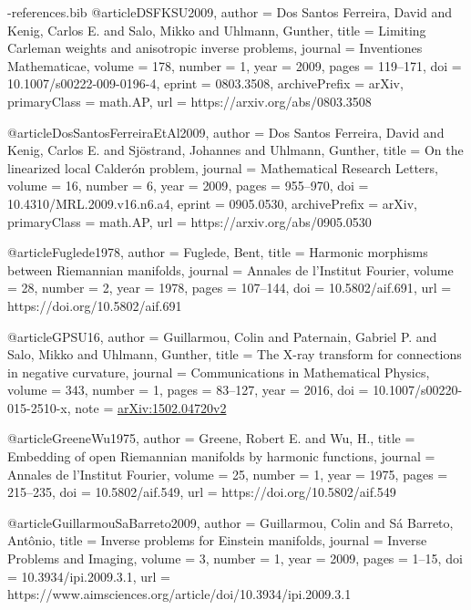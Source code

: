 \documentclass[11pt,a4paper]{article}
\theoremstyle{definition}
\theoremstyle{remark}
\numberwithin{equation}{section}
\begin{document}
\begin{filecontents*}[overwrite]{\jobname-references.bib}
@article{DSFKSU2009,
  author = {{Dos Santos Ferreira}, David and Kenig, Carlos E. and Salo, Mikko and Uhlmann, Gunther},
  title = {Limiting {Carleman} weights and anisotropic inverse problems},
  journal = {Inventiones Mathematicae},
  volume = {178},
  number = {1},
  year = {2009},
  pages = {119--171},
  doi = {10.1007/s00222-009-0196-4},
  eprint = {0803.3508},
  archivePrefix = {arXiv},
  primaryClass = {math.AP},
  url = {https://arxiv.org/abs/0803.3508}
}

@article{DosSantosFerreiraEtAl2009,
  author = {{Dos Santos Ferreira}, David and Kenig, Carlos E. and Sj{\"o}strand, Johannes and Uhlmann, Gunther},
  title = {On the linearized local {Calder{\'o}n} problem},
  journal = {Mathematical Research Letters},
  volume = {16},
  number = {6},
  year = {2009},
  pages = {955--970},
  doi = {10.4310/MRL.2009.v16.n6.a4},
  eprint = {0905.0530},
  archivePrefix = {arXiv},
  primaryClass = {math.AP},
  url = {https://arxiv.org/abs/0905.0530}
}

@article{Fuglede1978,
  author  = {Fuglede, Bent},
  title   = {Harmonic morphisms between {Riemannian} manifolds},
  journal = {Annales de l'Institut Fourier},
  volume  = {28},
  number  = {2},
  year    = {1978},
  pages   = {107--144},
  doi     = {10.5802/aif.691},
  url     = {https://doi.org/10.5802/aif.691}
}

@article{GPSU16,
  author = {Guillarmou, Colin and Paternain, Gabriel P. and Salo, Mikko and Uhlmann, Gunther},
  title = {The {X}-ray transform for connections in negative curvature},
  journal = {Communications in Mathematical Physics},
  volume = {343}, number = {1}, pages = {83--127}, year = {2016},
  doi = {10.1007/s00220-015-2510-x},
  note = {\href{https://arxiv.org/abs/1502.04720v2}{arXiv:1502.04720v2}}
}

@article{GreeneWu1975,
  author  = {Greene, Robert E. and Wu, H.},
  title   = {Embedding of open {Riemannian} manifolds by harmonic functions},
  journal = {Annales de l'Institut Fourier},
  volume  = {25},
  number  = {1},
  year    = {1975},
  pages   = {215--235},
  doi     = {10.5802/aif.549},
  url     = {https://doi.org/10.5802/aif.549}
}

@article{GuillarmouSaBarreto2009,
  author = {Guillarmou, Colin and S{\'a} Barreto, Ant{\^o}nio},
  title = {Inverse problems for {Einstein} manifolds},
  journal = {Inverse Problems and Imaging},
  volume = {3},
  number = {1},
  year = {2009},
  pages = {1--15},
  doi = {10.3934/ipi.2009.3.1},
  url = {https://www.aimsciences.org/article/doi/10.3934/ipi.2009.3.1}
}


\end{filecontents*}
\end{document}
